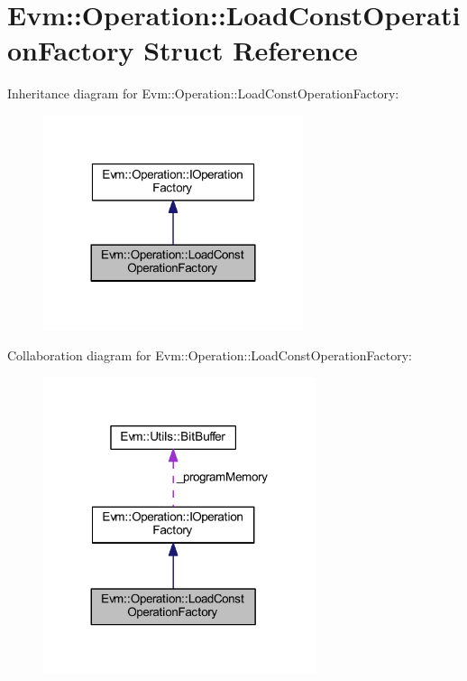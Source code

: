 \hypertarget{struct_evm_1_1_operation_1_1_load_const_operation_factory}{}\section{Evm\+:\+:Operation\+:\+:Load\+Const\+Operation\+Factory Struct Reference}
\label{struct_evm_1_1_operation_1_1_load_const_operation_factory}


Inheritance diagram for Evm\+:\+:Operation\+:\+:Load\+Const\+Operation\+Factory\+:
\nopagebreak
\begin{figure}[H]
\begin{center}
\leavevmode
\includegraphics[width=216pt]{struct_evm_1_1_operation_1_1_load_const_operation_factory__inherit__graph}
\end{center}
\end{figure}


Collaboration diagram for Evm\+:\+:Operation\+:\+:Load\+Const\+Operation\+Factory\+:
\nopagebreak
\begin{figure}[H]
\begin{center}
\leavevmode
\includegraphics[width=227pt]{struct_evm_1_1_operation_1_1_load_const_operation_factory__coll__graph}
\end{center}
\end{figure}
